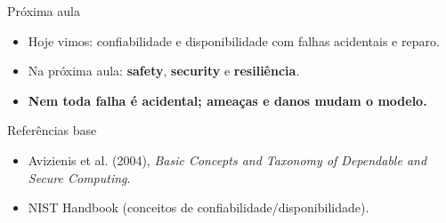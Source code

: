 \documentclass{beamer}
\begin{document}
\begin{frame}{Próxima aula}
\begin{itemize}\setlength{\itemsep}{2em}
  \item Hoje vimos: confiabilidade e disponibilidade com falhas acidentais e reparo.
  \item Na próxima aula: \textbf{safety}, \textbf{security} e \textbf{resiliência}.
  \item \textbf{Nem toda falha é acidental; ameaças e danos mudam o modelo.}
\end{itemize}
\end{frame}

\begin{frame}{Referências base}
\small
\begin{itemize}
  \item Avizienis et al. (2004), \textit{Basic Concepts and Taxonomy of Dependable and Secure Computing}.
  \item NIST Handbook (conceitos de confiabilidade/disponibilidade).
\end{itemize}
\end{frame}
\end{document}

